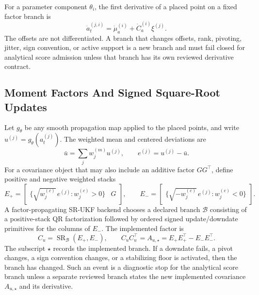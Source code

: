 For a parameter component \(\theta_i\), the first derivative of a placed point
on a fixed factor branch is
\begin{equation}
\label{eq:bf-srukf-factor-placement-first}
  \dot a_t^{(j,i)}
  =
  \dot\mu_a^{(i)}+\dot C_a^{(i)}\xi^{(j)} .
\end{equation}
The offsets are not differentiated.  A branch that changes offsets, rank,
pivoting, jitter, sign convention, or active support is a new branch and must
fail closed for analytical score admission unless that branch has its own
reviewed derivative contract.

\subsection{Moment Factors And Signed Square-Root Updates}
\label{sec:bf-srukf-moment-factor}

Let \(g_\theta\) be any smooth propagation map applied to the placed points, and
write \(u^{(j)}=g_\theta(a_t^{(j)})\).  The weighted mean and centered
deviations are
\[
  \bar u=\sum_j w_j^{(m)}u^{(j)},\qquad
  e^{(j)}=u^{(j)}-\bar u .
\]
For a covariance object that may also include an additive factor
\(G G^\top\), define positive and negative weighted stacks
\[
  E_+ =
  \begin{bmatrix}
    \{\sqrt{w_j^{(c)}}\,e^{(j)}: w_j^{(c)}>0\} & G
  \end{bmatrix},
  \qquad
  E_- =
  \begin{bmatrix}
    \{\sqrt{-w_j^{(c)}}\,e^{(j)}: w_j^{(c)}<0\}
  \end{bmatrix}.
\]
A factor-propagating SR-UKF backend chooses a declared branch
\(\mathcal B\) consisting of a positive-stack QR factorization followed by
ordered signed update/downdate primitives for the columns of \(E_-\).  The
implemented factor is
\begin{equation}
\label{eq:bf-srukf-weighted-moment-factor}
  C_u=\operatorname{SR}_{\mathcal B}(E_+,E_-),
  \qquad
  C_uC_u^\top
  =
  A_{u,\star}
  =
  E_+E_+^\top-E_-E_-^\top .
\end{equation}
The subscript \(\star\) records the implemented branch.  If a downdate fails,
a pivot changes, a sign convention changes, or a stabilizing floor is activated,
then the branch has changed.  Such an event is a diagnostic stop for the
analytical score branch unless a separate reviewed branch states the new
implemented covariance \(A_{u,\star}\) and its derivative.

